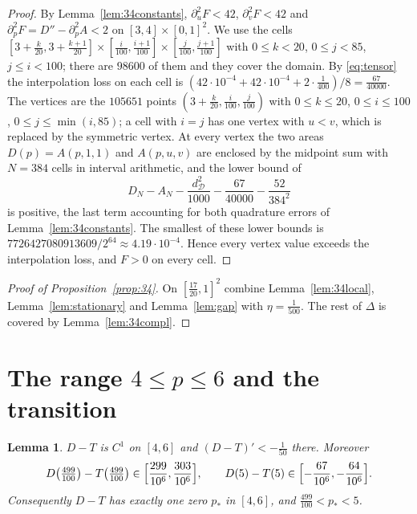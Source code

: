\documentclass[11pt]{amsart}
\newtheorem{lemma}[theorem]{Lemma}
\theoremstyle{definition}
\theoremstyle{remark}
\numberwithin{equation}{section}
\newcommand{\cD}{\mathcal{D}}
\begin{document}
\begin{proof}
By Lemma~\ref{lem:34constants}, $\partial_u^2F<42$, $\partial_v^2F<42$ and $\partial_p^2F=D''-\partial_p^2A<2$ on $[3,4]\times[0,1]^2$. We use the cells $[3+\frac k{20},3+\frac{k+1}{20}]\times[\frac i{100},\frac{i+1}{100}]\times[\frac j{100},\frac{j+1}{100}]$ with $0\le k<20$, $0\le j<85$, $j\le i<100$; there are $98600$ of them and they cover the domain. By \eqref{eq:tensor} the interpolation loss on each cell is $(42\cdot10^{-4}+42\cdot10^{-4}+2\cdot\frac1{400})/8=\frac{67}{40000}$. The vertices are the $105651$ points $(3+\frac k{20},\frac i{100},\frac j{100})$ with $0\le k\le20$, $0\le i\le100$, $0\le j\le\min(i,85)$; a cell with $i=j$ has one vertex with $u<v$, which is replaced by the symmetric vertex. At every vertex the two areas $D(p)=A(p,1,1)$ and $A(p,u,v)$ are enclosed by the midpoint sum with $N=384$ cells in interval arithmetic, and the lower bound of
\[
D_N-A_N-\frac{d_\cD^2}{1000}-\frac{67}{40000}-\frac{52}{384^2}
\]
is positive, the last term accounting for both quadrature errors of Lemma~\ref{lem:34constants}. The smallest of these lower bounds is $7726427080913609/2^{64}\approx4.19\cdot10^{-4}$. Hence every vertex value exceeds the interpolation loss, and $F>0$ on every cell.
\end{proof}

\begin{proof}[Proof of Proposition~\ref{prop:34}]
On $[\frac{17}{20},1]^2$ combine Lemma~\ref{lem:34local}, Lemma~\ref{lem:stationary} and Lemma~\ref{lem:gap} with $\eta=\frac1{500}$. The rest of $\Delta$ is covered by Lemma~\ref{lem:34compl}.
\end{proof}

\section{The range \texorpdfstring{$4\le p\le6$}{4<=p<=6} and the transition}\label{sec:46}

\begin{lemma}\label{lem:branchcmp}
$D-T$ is $C^1$ on $[4,6]$ and $(D-T)'<-\frac1{50}$ there. Moreover
\[
D\bigl(\tfrac{499}{100}\bigr)-T\bigl(\tfrac{499}{100}\bigr)\in\Bigl[\frac{299}{10^6},\frac{303}{10^6}\Bigr],\qquad D(5)-T(5)\in\Bigl[-\frac{67}{10^6},-\frac{64}{10^6}\Bigr].
\]
Consequently $D-T$ has exactly one zero $p_*$ in $[4,6]$, and $\frac{499}{100}<p_*<5$.
\end{lemma}
\end{document}
